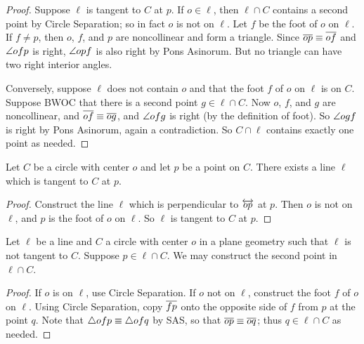 \begin{proof}
Suppose \(\ell\) is tangent to \(C\) at \(p\).
If \(o \in \ell\), then \(\ell \cap C\) contains a second point by Circle Separation; so in fact \(o\) is not on \(\ell\).
Let \(f\) be the foot of \(o\) on \(\ell\).
If \(f \neq p\), then \(o\), \(f\), and \(p\) are noncollinear and form a triangle.
Since \(\overline{op} \equiv \overline{of}\) and \(\angle{ofp}\) is right, \(\angle{opf}\) is also right by Pons Asinorum.
But no triangle can have two right interior angles.

Conversely, suppose \(\ell\) does not contain \(o\) and that the foot \(f\) of \(o\) on \(\ell\) is on \(C\).
Suppose BWOC that there is a second point \(g \in \ell \cap C\).
Now \(o\), \(f\), and \(g\) are noncollinear, and \(\overline{of} \equiv \overline{og}\), and \(\angle{ofg}\) is right (by the definition of foot).
So \(\angle{ogf}\) is right by Pons Asinorum, again a contradiction.
So \(C \cap \ell\) contains exactly one point as needed.
\end{proof}

\begin{construct}
Let \(C\) be a circle with center \(o\) and let \(p\) be a point on \(C\).
There exists a line \(\ell\) which is tangent to \(C\) at \(p\).
\end{construct}

\begin{proof}
Construct the line \(\ell\) which is perpendicular to \(\overleftrightarrow{op}\) at \(p\).
Then \(o\) is not on \(\ell\), and \(p\) is the foot of \(o\) on \(\ell\).
So \(\ell\) is tangent to \(C\) at \(p\).
\end{proof}

\begin{construct}
Let \(\ell\) be a line and \(C\) a circle with center \(o\) in a plane geometry such that \(\ell\) is not tangent to \(C\).
Suppose \(p \in \ell \cap C\).
We may construct the second point in \(\ell \cap C\).
\end{construct}

\begin{proof}
If \(o\) is on \(\ell\), use Circle Separation.
If \(o\) not on \(\ell\), construct the foot \(f\) of \(o\) on \(\ell\).
Using Circle Separation, copy \(\overline{fp}\) onto the opposite side of \(f\) from \(p\) at the point \(q\).
Note that \(\bigtriangleup{ofp} \equiv \bigtriangleup{ofq}\) by SAS, so that \(\overline{op} \equiv \overline{oq}\); thus \(q \in \ell \cap C\) as needed.
\end{proof}

